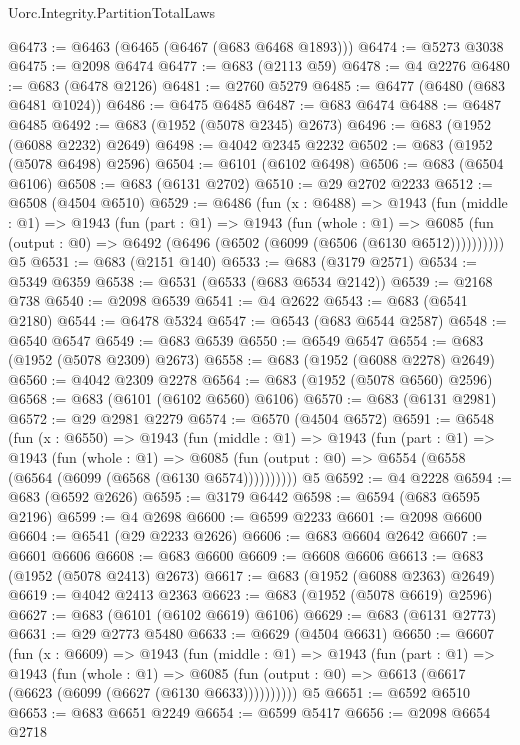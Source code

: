 \begin{lexlean}{Uorc.Integrity.PartitionTotalLaws}
\begin{coremodule}
@6473 := @6463 (@6465 (@6467 (@683 @6468 @1893)))
@6474 := @5273 @3038
@6475 := @2098 @6474
@6477 := @683 (@2113 @59)
@6478 := @4 @2276
@6480 := @683 (@6478 @2126)
@6481 := @2760 @5279
@6485 := @6477 (@6480 (@683 @6481 @1024))
@6486 := @6475 @6485
@6487 := @683 @6474
@6488 := @6487 @6485
@6492 := @683 (@1952 (@5078 @2345) @2673)
@6496 := @683 (@1952 (@6088 @2232) @2649)
@6498 := @4042 @2345 @2232
@6502 := @683 (@1952 (@5078 @6498) @2596)
@6504 := @6101 (@6102 @6498)
@6506 := @683 (@6504 @6106)
@6508 := @683 (@6131 @2702)
@6510 := @29 @2702 @2233
@6512 := @6508 (@4504 @6510)
@6529 := @6486
    (fun (x : @6488) =>
    @1943
      (fun (middle : @1) =>
      @1943
        (fun (part : @1) =>
        @1943
          (fun (whole : @1) =>
          @6085 (fun (output : @0) => @6492 (@6496 (@6502 (@6099 (@6506 (@6130 @6512))))))))))
    @5
@6531 := @683 (@2151 @140)
@6533 := @683 (@3179 @2571)
@6534 := @5349 @6359
@6538 := @6531 (@6533 (@683 @6534 @2142))
@6539 := @2168 @738
@6540 := @2098 @6539
@6541 := @4 @2622
@6543 := @683 (@6541 @2180)
@6544 := @6478 @5324
@6547 := @6543 (@683 @6544 @2587)
@6548 := @6540 @6547
@6549 := @683 @6539
@6550 := @6549 @6547
@6554 := @683 (@1952 (@5078 @2309) @2673)
@6558 := @683 (@1952 (@6088 @2278) @2649)
@6560 := @4042 @2309 @2278
@6564 := @683 (@1952 (@5078 @6560) @2596)
@6568 := @683 (@6101 (@6102 @6560) @6106)
@6570 := @683 (@6131 @2981)
@6572 := @29 @2981 @2279
@6574 := @6570 (@4504 @6572)
@6591 := @6548
    (fun (x : @6550) =>
    @1943
      (fun (middle : @1) =>
      @1943
        (fun (part : @1) =>
        @1943
          (fun (whole : @1) =>
          @6085 (fun (output : @0) => @6554 (@6558 (@6564 (@6099 (@6568 (@6130 @6574))))))))))
    @5
@6592 := @4 @2228
@6594 := @683 (@6592 @2626)
@6595 := @3179 @6442
@6598 := @6594 (@683 @6595 @2196)
@6599 := @4 @2698
@6600 := @6599 @2233
@6601 := @2098 @6600
@6604 := @6541 (@29 @2233 @2626)
@6606 := @683 @6604 @2642
@6607 := @6601 @6606
@6608 := @683 @6600
@6609 := @6608 @6606
@6613 := @683 (@1952 (@5078 @2413) @2673)
@6617 := @683 (@1952 (@6088 @2363) @2649)
@6619 := @4042 @2413 @2363
@6623 := @683 (@1952 (@5078 @6619) @2596)
@6627 := @683 (@6101 (@6102 @6619) @6106)
@6629 := @683 (@6131 @2773)
@6631 := @29 @2773 @5480
@6633 := @6629 (@4504 @6631)
@6650 := @6607
    (fun (x : @6609) =>
    @1943
      (fun (middle : @1) =>
      @1943
        (fun (part : @1) =>
        @1943
          (fun (whole : @1) =>
          @6085 (fun (output : @0) => @6613 (@6617 (@6623 (@6099 (@6627 (@6130 @6633))))))))))
    @5
@6651 := @6592 @6510
@6653 := @683 @6651 @2249
@6654 := @6599 @5417
@6656 := @2098 @6654 @2718

\end{coremodule}
\end{lexlean}
